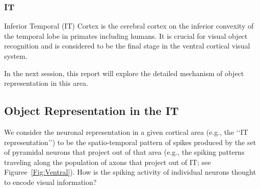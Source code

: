 \subsubsection{IT}
Inferior Temporal (IT) Cortex is the cerebral cortex on the inferior convexity of the temporal lobe in primates including humans. 
It is crucial for visual object recognition and is considered to be the final stage in the ventral cortical visual system.

In the next session, this report will explore the detailed mechanism of object representation in this area.
\subsection{Object Representation in the IT}
We consider the neuronal representation in a given
cortical area (e.g., the ‘‘IT representation’’) to be the spatio-temporal pattern of spikes produced by the set of pyramidal neurons
that project out of that area (e.g., the spiking patterns traveling
along the population of axons that project out of IT; see
Figuree~\ref{Fig:Ventral}). How is the spiking activity of individual neurons
thought to encode visual information?

